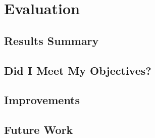 \chapter{Evaluation}

\section{Results Summary}

\section{Did I Meet My Objectives?}

\section{Improvements}

\section{Future Work}

